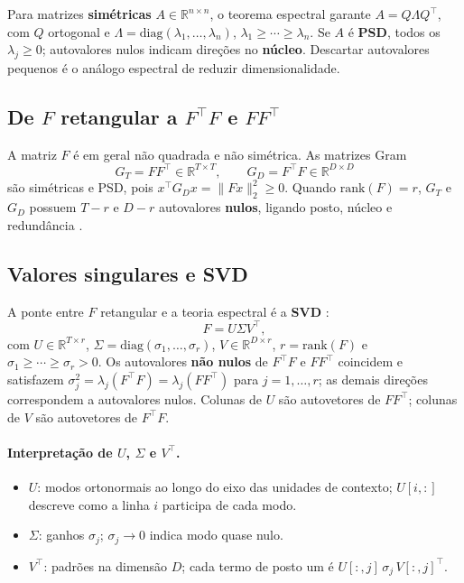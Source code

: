 Para matrizes \textbf{simétricas} $A \in \mathbb{R}^{n \times n}$, o teorema espectral \cite{alc19espectral} garante $A = Q \Lambda Q^\top$, com $Q$ ortogonal e $\Lambda = \mathrm{diag}(\lambda_1,\ldots,\lambda_n)$, $\lambda_1 \geq \cdots \geq \lambda_n$. Se $A$ é \textbf{PSD}, todos os $\lambda_j \geq 0$; autovalores nulos indicam direções no \textbf{núcleo}. Descartar autovalores pequenos é o análogo espectral de reduzir dimensionalidade.

\subsection{De $F$ retangular a $F^\top F$ e $F F^\top$}

A matriz $F$ é em geral não quadrada e não simétrica. As matrizes Gram
$$
G_T = F F^\top \in \mathbb{R}^{T \times T}, \qquad G_D = F^\top F \in \mathbb{R}^{D \times D}
$$
são simétricas e PSD, pois $x^\top G_D x = \|F x\|_2^2 \geq 0$. Quando $\mathrm{rank}(F) = r$, $G_T$ e $G_D$ possuem $T-r$ e $D-r$ autovalores \textbf{nulos}, ligando posto, núcleo e redundância \cite{alcposto,alc19espectral}.

\subsection{Valores singulares e SVD}

A ponte entre $F$ retangular e a teoria espectral é a \textbf{SVD} \cite{alc21svd}:
$$
F = U \Sigma V^\top,
$$
com $U \in \mathbb{R}^{T \times r}$, $\Sigma = \mathrm{diag}(\sigma_1,\ldots,\sigma_r)$, $V \in \mathbb{R}^{D \times r}$, $r = \mathrm{rank}(F)$ e $\sigma_1 \geq \cdots \geq \sigma_r > 0$. Os autovalores \textbf{não nulos} de $F^\top F$ e $F F^\top$ coincidem e satisfazem $\sigma_j^2 = \lambda_j(F^\top F) = \lambda_j(F F^\top)$ para $j=1,\ldots,r$; as demais direções correspondem a autovalores nulos. Colunas de $U$ são autovetores de $F F^\top$; colunas de $V$ são autovetores de $F^\top F$.

\paragraph{Interpretação de $U$, $\Sigma$ e $V^\top$.}
\begin{itemize}
    \item \textbf{$U$}: modos ortonormais ao longo do eixo das unidades de contexto; $U[i,:]$ descreve como a linha $i$ participa de cada modo.
    \item \textbf{$\Sigma$}: ganhos $\sigma_j$; $\sigma_j \to 0$ indica modo quase nulo.
    \item \textbf{$V^\top$}: padrões na dimensão $D$; cada termo de posto um é $U[:,j]\,\sigma_j\, V[:,j]^\top$.
\end{itemize}

